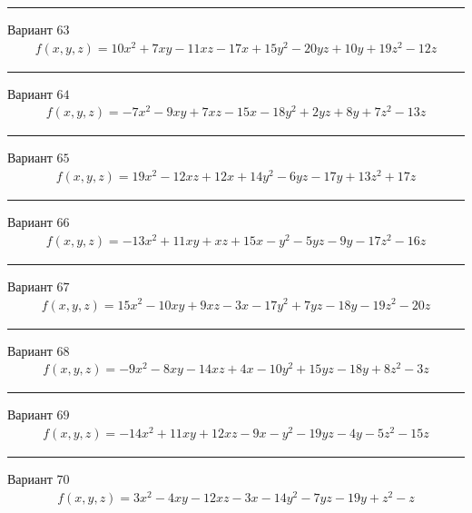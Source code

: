 \documentclass[11pt]{report}
\begin{document}
\begin{center}
\noindent\rule{8cm}{0.4pt}
\end{center}
Вариант $63$
\begin{align*}
    f(x, y, z) = 10 x^{2} + 7 x y - 11 x z - 17 x + 15 y^{2} - 20 y z + 10 y + 19 z^{2} - 12 z
\end{align*}
\begin{center}
\noindent\rule{8cm}{0.4pt}
\end{center}
Вариант $64$
\begin{align*}
    f(x, y, z) = - 7 x^{2} - 9 x y + 7 x z - 15 x - 18 y^{2} + 2 y z + 8 y + 7 z^{2} - 13 z
\end{align*}
\begin{center}
\noindent\rule{8cm}{0.4pt}
\end{center}
Вариант $65$
\begin{align*}
    f(x, y, z) = 19 x^{2} - 12 x z + 12 x + 14 y^{2} - 6 y z - 17 y + 13 z^{2} + 17 z
\end{align*}
\begin{center}
\noindent\rule{8cm}{0.4pt}
\end{center}
Вариант $66$
\begin{align*}
    f(x, y, z) = - 13 x^{2} + 11 x y + x z + 15 x - y^{2} - 5 y z - 9 y - 17 z^{2} - 16 z
\end{align*}
\begin{center}
\noindent\rule{8cm}{0.4pt}
\end{center}
Вариант $67$
\begin{align*}
    f(x, y, z) = 15 x^{2} - 10 x y + 9 x z - 3 x - 17 y^{2} + 7 y z - 18 y - 19 z^{2} - 20 z
\end{align*}
\begin{center}
\noindent\rule{8cm}{0.4pt}
\end{center}
Вариант $68$
\begin{align*}
    f(x, y, z) = - 9 x^{2} - 8 x y - 14 x z + 4 x - 10 y^{2} + 15 y z - 18 y + 8 z^{2} - 3 z
\end{align*}
\begin{center}
\noindent\rule{8cm}{0.4pt}
\end{center}
Вариант $69$
\begin{align*}
    f(x, y, z) = - 14 x^{2} + 11 x y + 12 x z - 9 x - y^{2} - 19 y z - 4 y - 5 z^{2} - 15 z
\end{align*}
\begin{center}
\noindent\rule{8cm}{0.4pt}
\end{center}
Вариант $70$
\begin{align*}
    f(x, y, z) = 3 x^{2} - 4 x y - 12 x z - 3 x - 14 y^{2} - 7 y z - 19 y + z^{2} - z
\end{align*}
\end{document}
